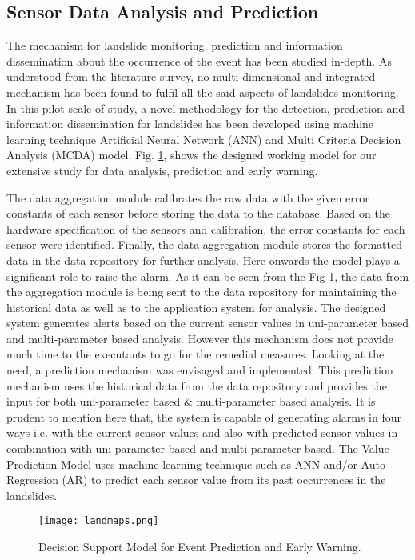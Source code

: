 \documentclass[conference]{IEEEtran}
\begin{document}
\subsection{Sensor Data Analysis and Prediction}
The mechanism for landslide monitoring, prediction and information dissemination about the occurrence of the event has
been studied in-depth. As understood from the literature survey, no multi-dimensional and integrated mechanism has been found to fulfil all the said aspects of landslides monitoring. In this pilot scale of study, a novel methodology for the detection, prediction and information dissemination for landslides has been developed using machine learning technique Artificial Neural Network (ANN) and Multi Criteria Decision Analysis (MCDA) model. Fig. \ref{fig:model}, shows the designed working model for our extensive study for data analysis, prediction and early warning.
\par
The data aggregation module calibrates the raw data with the given error constants of each sensor before storing the data to the database. Based on the hardware specification of the sensors and calibration, the error constants for each sensor were identified. Finally, the data aggregation module stores the formatted data in the data repository for further analysis.
Here onwards the model plays a significant role to raise the alarm. As it can be seen from the Fig \ref{fig:model}, the data from the aggregation module is being sent to the data repository for maintaining the historical data as well as to the application system for analysis. The designed system generates alerts based on the current sensor values in uni-parameter based and multi-parameter based analysis. However this mechanism does not provide much time to the executants to go for the remedial measures. Looking at the need, a prediction mechanism was envisaged and implemented. This prediction
mechanism uses the historical data from the data repository and provides the input for both uni-parameter based \& multi-parameter based analysis. It is prudent to mention here that, the system is capable of generating alarms in four ways i.e. with the current sensor values and also with predicted sensor values in combination with uni-parameter based and multi-parameter based. The Value Prediction Model uses machine learning technique such as ANN and/or Auto Regression (AR) to predict each sensor value from its past occurrences in the landslides.
\begin{figure}[h!]
    \centering
    \texttt{[image: landmaps.png]}
\caption{Decision Support Model for Event Prediction and Early Warning.}
  \label{fig:model}
\end{figure}
\end{document}
